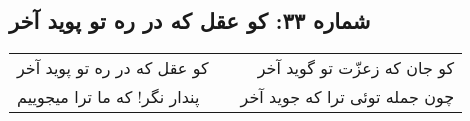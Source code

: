 \begin{center}
\section*{شماره ۳۳: کو عقل که در ره تو پوید آخر}
\label{sec:033}
\begin{longtable}{l p{0.5cm} r}
کو عقل که در ره تو پوید آخر
&&
کو جان که زعزّت تو گوید آخر
\\
پندار نگر! که ما ترا میجوییم
&&
چون جمله توئی ترا که جوید آخر
\\
\end{longtable}
\end{center}
